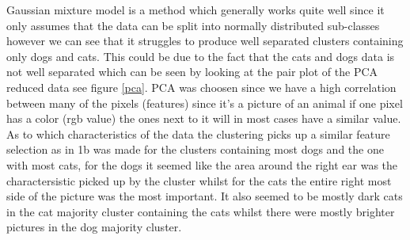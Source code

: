\documentclass{article}
\begin{document}
Gaussian mixture model is a method which generally works quite well since it only assumes that the data can be split into normally distributed sub-classes however we can see that it struggles to produce well separated clusters containing only dogs and cats. This could be due to the fact that the cats and dogs data is not well separated which can be seen by looking at the pair plot of the PCA reduced data see figure \ref{pca}. PCA was choosen since we have a high correlation between many of the pixels (features) since it's a picture of an animal if one pixel has a color (rgb value) the ones next to it will in most cases have a similar value. As to which characteristics of the data the clustering picks up a similar feature selection as in 1b was made for the clusters containing most dogs and the one with most cats, for the dogs it seemed like the area around the right ear was the charactersistic picked up by the cluster whilst for the cats the entire right most side of the picture was the most important. It also seemed to be mostly dark cats in the cat majority cluster containing the cats whilst there were mostly brighter pictures in the dog majority cluster.
\end{document}

